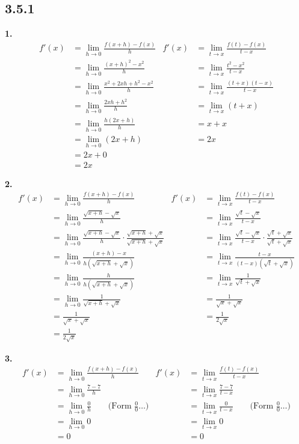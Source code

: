 \documentclass[10pt,oneside,]{book}
\theoremstyle{plain}
\theoremstyle{definition}
\numberwithin{equation}{section}
\newcommand{\fe}[2]{#1\mathopen{}\left(#2\right)\mathclose{}}
\newcommand{\fd}[1]{#1'}
\begin{document}
\subsection*{3.5.1 }
\noindent\textbf{1.}\quad{}\begin{align*}
\fe{\fd{f}}{x}&=\lim_{h\to0}\frac{\fe{f}{x+h}-\fe{f}{x}}{h}&\fe{\fd{f}}{x}&=\lim_{t\to x}\frac{\fe{f}{t}-\fe{f}{x}}{t-x}\\
&=\lim_{h\to0}\frac{(x+h)^2-x^2}{h}&&=\lim_{t\to x}\frac{t^2-x^2}{t-x}\\
&=\lim_{h\to0}\frac{x^2+2xh+h^2-x^2}{h}&&=\lim_{t\to x}\frac{(t+x)(t-x)}{t-x}\\
&=\lim_{h\to0}\frac{2xh+h^2}{h}&&=\lim_{t\to x}(t+x)\\
&=\lim_{h\to0}\frac{h(2x+h)}{h}&&=x+x\\
&=\lim_{h\to0}(2x+h)&&=2x\\
&=2x+0\\
&=2x
\end{align*}%
\par\smallskip
\noindent\textbf{2.}\quad{}\begin{align*}
\fe{\fd{f}}{x}&=\lim_{h\to0}\frac{\fe{f}{x+h}-\fe{f}{x}}{h}&\fe{\fd{f}}{x}&=\lim_{t\to x}\frac{\fe{f}{t}-\fe{f}{x}}{t-x}\\
&=\lim_{h\to0}\frac{\sqrt{x+h}-\sqrt{x}}{h}&&=\lim_{t\to x}\frac{\sqrt{t}-\sqrt{x}}{t-x}\\
&=\lim_{h\to0}\frac{\sqrt{x+h}-\sqrt{x}}{h}\cdot\frac{\sqrt{x+h}+\sqrt{x}}{\sqrt{x+h}+\sqrt{x}}&&=\lim_{t\to x}\frac{\sqrt{t}-\sqrt{x}}{t-x}\cdot\frac{\sqrt{t}+\sqrt{x}}{\sqrt{t}+\sqrt{x}}\\
&=\lim_{h\to0}\frac{(x+h)-x}{h\left(\sqrt{x+h}+\sqrt{x}\right)}&&=\lim_{t\to x}\frac{t-x}{(t-x)\left(\sqrt{t}+\sqrt{x}\right)}\\
&=\lim_{h\to0}\frac{h}{h\left(\sqrt{x+h}+\sqrt{x}\right)}&&=\lim_{t\to x}\frac{1}{\sqrt{t}+\sqrt{x}}\\
&=\lim_{h\to0}\frac{1}{\sqrt{x+h}+\sqrt{x}}&&=\frac{1}{\sqrt{x}+\sqrt{x}}\\
&=\frac{1}{\sqrt{x}+\sqrt{x}}&&=\frac{1}{2\sqrt{x}}\\
&=\frac{1}{2\sqrt{x}}
\end{align*}%
\par\smallskip
\noindent\textbf{3.}\quad{}\begin{align*}
\fe{\fd{f}}{x}&=\lim_{h\to0}\frac{\fe{f}{x+h}-\fe{f}{x}}{h}&\fe{\fd{f}}{x}&=
\lim_{t\to x}\frac{\fe{f}{t}-\fe{f}{x}}{t-x}\\
&=\lim_{h\to0}\frac{7-7}{h}&&=\lim_{t\to x}\frac{7-7}{t-x}\\
&=\lim_{h\to0}\frac{0}{h}\qquad\text{(Form $\frac{0}{0}$\ldots)}&&=\lim_{t\to x}\frac{0}{t-x}\qquad\text{(Form $\frac{0}{0}$\ldots)}\\
&=\lim_{h\to0}0&&=\lim_{t\to x}0\\
&=0&&=0
\end{align*}%
\end{document}
